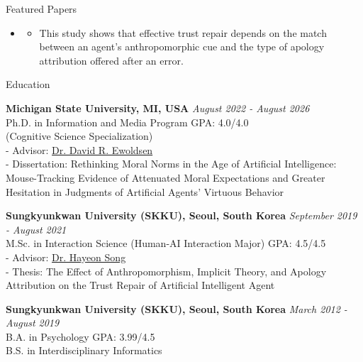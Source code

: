 \documentclass{resume} %
\begin{document}
\begin{rSection}{Featured Papers}
\begin{itemize}
\begin{itemize}
\end{itemize}

 \item {} %
\begin{itemize}
\item This study shows that effective trust repair depends on the match between an agent's anthropomorphic cue and the type of apology attribution offered after an error.
\end{itemize}
\end{itemize}

\end{rSection}
\newpage
\begin{rSection}{Education}

{\bf Michigan State University, MI, USA} \hfill {\em August 2022 - August 2026}
\\ Ph.D. in Information and Media Program \hfill { GPA: 4.0/4.0 }
\\(Cognitive Science Specialization)
\\ - Advisor: \href{https://scholar.google.com/citations?user=OntC7VQAAAAJ&hl=en}{Dr. David R. Ewoldsen}
\\ - Dissertation: Rethinking Moral Norms in the Age of Artificial Intelligence: Mouse-Tracking Evidence of Attenuated Moral Expectations and Greater Hesitation in Judgments of Artificial Agents’ Virtuous Behavior

{\bf Sungkyunkwan University (SKKU), Seoul, South Korea} \hfill {\em September 2019 - August 2021}
\\ M.Sc. in Interaction Science (Human-AI Interaction Major) \hfill { GPA: 4.5/4.5 }
\\ - Advisor: \href{https://scholar.google.com/citations?hl=ko&user=BO-AgNYAAAAJ}{Dr. Hayeon Song}
\\ - Thesis: The Effect of Anthropomorphism, Implicit Theory, and Apology Attribution on the Trust Repair of Artificial Intelligent Agent


{\bf Sungkyunkwan University (SKKU), Seoul, South Korea} \hfill {\em March 2012 - August 2019} 
\\ B.A. in Psychology \hfill { GPA: 3.99/4.5 }
\\ B.S. in Interdisciplinary Informatics


\end{rSection}
\end{document}
